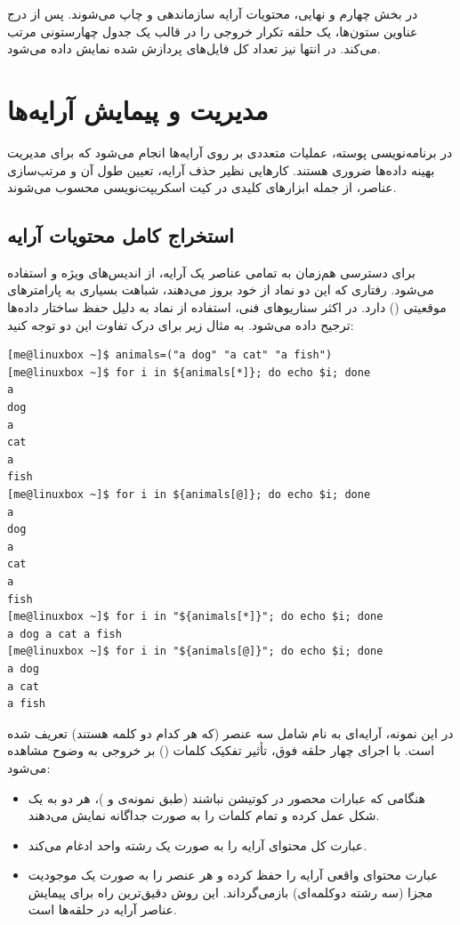 در بخش چهارم و نهایی، محتویات آرایه سازماندهی و چاپ می‌شوند. پس از درج عناوین ستون‌ها، یک حلقه تکرار خروجی را در قالب یک جدول چهارستونی مرتب می‌کند. در انتها نیز تعداد کل فایل‌های پردازش شده نمایش داده می‌شود.

\section{مدیریت و پیمایش آرایه‌ها}

در برنامه‌نویسی پوسته، عملیات متعددی بر روی آرایه‌ها انجام می‌شود که برای مدیریت بهینه داده‌ها ضروری هستند. کارهایی نظیر حذف آرایه، تعیین طول آن و مرتب‌سازی عناصر، از جمله ابزارهای کلیدی در کیت اسکریپت‌نویسی محسوب می‌شوند.

\subsection{استخراج کامل محتویات آرایه}

برای دسترسی هم‌زمان به تمامی عناصر یک آرایه، از اندیس‌های ویژه \cmd{*} و  استفاده می‌شود. رفتاری که این دو نماد از خود بروز می‌دهند، شباهت بسیاری به پارامترهای موقعیتی () دارد. در اکثر سناریوهای فنی، استفاده از نماد  به دلیل حفظ ساختار داده‌ها ترجیح داده می‌شود. به مثال زیر برای درک تفاوت این دو توجه کنید:

\begin{latin}
\begin{lstlisting}
[me@linuxbox ~]$ animals=("a dog" "a cat" "a fish")
[me@linuxbox ~]$ for i in ${animals[*]}; do echo $i; done
a
dog
a
cat
a
fish
[me@linuxbox ~]$ for i in ${animals[@]}; do echo $i; done
a
dog
a
cat
a
fish
[me@linuxbox ~]$ for i in "${animals[*]}"; do echo $i; done
a dog a cat a fish
[me@linuxbox ~]$ for i in "${animals[@]}"; do echo $i; done
a dog
a cat
a fish
\end{lstlisting}
\end{latin}

در این نمونه، آرایه‌ای به نام  شامل سه عنصر (که هر کدام دو کلمه هستند) تعریف شده است. با اجرای چهار حلقه فوق، تأثیر تفکیک کلمات () بر خروجی به وضوح مشاهده می‌شود:

\begin{itemize}
  \item هنگامی که عبارات محصور در کوتیشن نباشند (طبق نمونه‌ی  و )، هر دو به یک شکل عمل کرده و تمام کلمات را به صورت جداگانه نمایش می‌دهند.
  \item عبارت  کل محتوای آرایه را به صورت یک رشته واحد ادغام می‌کند.
  \item عبارت  محتوای واقعی آرایه را حفظ کرده و هر عنصر را به صورت یک موجودیت مجزا (سه رشته دوکلمه‌ای) بازمی‌گرداند. این روش دقیق‌ترین راه برای پیمایش عناصر آرایه در حلقه‌ها است.
\end{itemize}


